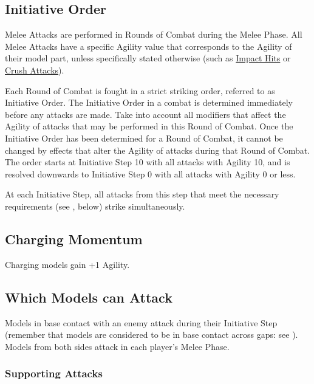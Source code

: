 \columnbreak

\subsection{Initiative Order}
\label{initiative_order}

Melee Attacks are performed in Rounds of Combat during the Melee Phase. All Melee Attacks have a specific Agility value that corresponds to the Agility of their model part, unless specifically stated otherwise (such as \hyperref[impact_hits]{Impact Hits} or \hyperref[crush_attack]{Crush Attacks}).
\par
Each Round of Combat is fought in a strict striking order, referred to as Initiative Order. The Initiative Order in a combat is determined immediately before any attacks are made. Take into account all modifiers that affect the Agility of attacks that may be performed in this Round of Combat. Once the Initiative Order has been determined for a Round of Combat, it cannot be changed by effects that alter the Agility of attacks during that Round of Combat. The order starts at Initiative Step 10 with all attacks with Agility 10, and is resolved downwards to Initiative Step 0 with all attacks with Agility 0 or less.
\par
At each Initiative Step, all attacks from this step that meet the necessary requirements (see , below) strike simultaneously.

\subsection{Charging Momentum}
\label{charging_momentum}

Charging models gain +1 Agility.

\subsection{Which Models can Attack}
\label{which_models_can_attack}

Models in base contact with an enemy attack during their Initiative Step (remember that models are considered to be in base contact across gaps: see ). Models from both sides attack in each player's Melee Phase.

\subsubsection{Supporting Attacks}
\label{supporting_attacks}

